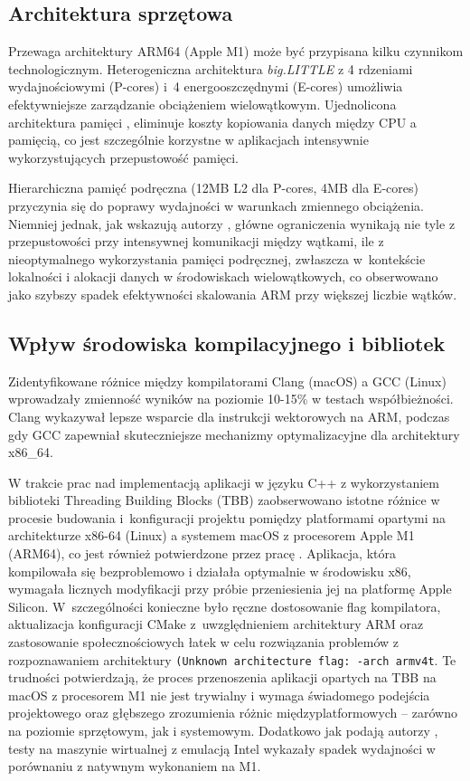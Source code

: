\subsection{Architektura sprzętowa}

Przewaga architektury ARM64 (Apple M1) może być przypisana kilku czynnikom technologicznym. Heterogeniczna architektura \emph{big.LITTLE} z 4 rdzeniami wydajnościowymi (P-cores) i~4 energooszczędnymi (E-cores) umożliwia efektywniejsze zarządzanie obciążeniem wielowątkowym. Ujednolicona architektura pamięci , eliminuje koszty kopiowania danych między CPU a pamięcią, co jest szczególnie korzystne w aplikacjach intensywnie wykorzystujących przepustowość pamięci.

Hierarchiczna pamięć podręczna (12MB L2 dla P-cores, 4MB dla E-cores) przyczynia się do poprawy wydajności w warunkach zmiennego obciążenia. Niemniej jednak, jak wskazują autorzy \cite{arml2c}, główne ograniczenia wynikają nie tyle z przepustowości przy intensywnej komunikacji między wątkami, ile z nieoptymalnego wykorzystania pamięci podręcznej, zwłaszcza w~kontekście lokalności i alokacji danych w środowiskach wielowątkowych, co obserwowano jako szybszy spadek efektywności skalowania ARM przy większej liczbie wątków.

\subsection{Wpływ środowiska kompilacyjnego i bibliotek}

Zidentyfikowane różnice między kompilatorami Clang (macOS) a GCC (Linux) wprowadzały zmienność wyników na poziomie 10-15\% w testach współbieżności. Clang wykazywał lepsze wsparcie dla instrukcji wektorowych na ARM, podczas gdy GCC zapewniał skuteczniejsze mechanizmy optymalizacyjne dla architektury x86\_64. 

W trakcie prac nad implementacją aplikacji w języku C++ z wykorzystaniem biblioteki Threading Building Blocks (TBB) zaobserwowano istotne różnice w procesie budowania i~konfiguracji projektu pomiędzy platformami opartymi na architekturze x86-64 (Linux) a systemem macOS z procesorem Apple M1 (ARM64), co jest również potwierdzone przez pracę \cite{ARMTBB}. Aplikacja, która kompilowała się bezproblemowo i działała optymalnie w środowisku x86, wymagała licznych modyfikacji przy próbie przeniesienia jej na platformę Apple Silicon. W~szczególności konieczne było ręczne dostosowanie flag kompilatora, aktualizacja konfiguracji CMake z~uwzględnieniem architektury ARM oraz zastosowanie społecznościowych łatek w celu rozwiązania problemów z rozpoznawaniem architektury \texttt{(Unknown architecture flag: \mbox{-arch armv4t}}. Te trudności potwierdzają, że proces przenoszenia aplikacji opartych na TBB na \mbox{macOS} z procesorem M1 nie jest trywialny i wymaga świadomego podejścia projektowego oraz głębszego zrozumienia różnic międzyplatformowych -- zarówno na poziomie sprzętowym, jak i systemowym. Dodatkowo jak podają autorzy \cite{TBBARMCONCLUSIONS}, testy na maszynie wirtualnej z emulacją Intel wykazały spadek wydajności w porównaniu z natywnym wykonaniem na M1.

